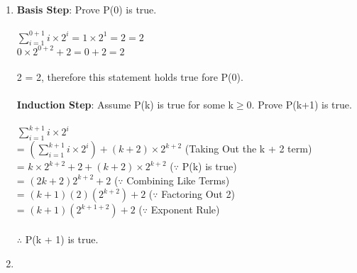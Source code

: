 \documentclass[12pt]{article}
\begin{document}
\begin{enumerate}[label = (\alph*)]
    \item
    
        \textbf{Basis Step}: Prove P(0) is true. \\
        \\
        $\sum_{i=1}^{0 + 1} i\times2^i = 1\times2^1 = 2 = 2$ \\
        $0\times 2^{0+2}+2 = 0+2 = 2$ \\
        \\
        2 = 2, therefore this statement holds true fore P(0). \\
        \\
        \textbf{Induction Step}: Assume P(k) is true for some k$\geq$0. Prove P(k+1)
                                 is true. \\
        \\
        $\sum_{i=1}^{k + 1} i\times2^i$ \\
        = $(\sum_{i=1}^{k + 1} i\times2^i) + (k + 2)\times 2^{k+2}$ (Taking Out the k + 2 term) \\
        = $k\times 2^{k+2}+2 + (k + 2)\times 2^{k+2}$ \hspace{3em} ($\because$ P(k) is true) \\
        = $(2k + 2)2^{k+2}+2$ \hspace{3em} ($\because$ Combining Like Terms) \\
        = $(k + 1)(2)(2^{k+2})+2$ \hspace{3em} ($\because$ Factoring Out 2) \\
        = $(k + 1)(2^{k+1+2})+2$ \hspace{3em} ($\because$ Exponent Rule) \\
        \\
        $\therefore$ P(k + 1) is true.

    \item


\end{enumerate}
\end{document}
